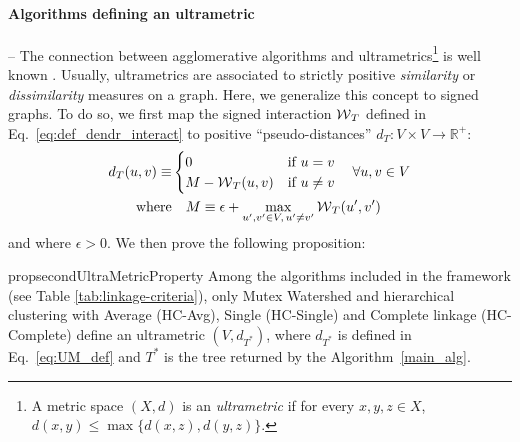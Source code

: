\paragraph{Algorithms defining an ultrametric} -- The connection between agglomerative algorithms and ultrametrics\footnote{A metric space $(X,d)$ is an \emph{ultrametric} if for every $x,y,z \in X$, $d(x,y)\leq \max \{d(x,z), d(y,z)\}$.} is well known \cite{johnson1967hierarchical,milligan1979ultrametric}. Usually, ultrametrics are associated to strictly positive \emph{similarity} or \emph{dissimilarity} measures on a graph. Here, we generalize this concept to signed graphs. To do so, we first map the signed interaction $\mathcal{W}{}_{T}{}$ defined in Eq.~\ref{eq:def_dendr_interact} to positive ``pseudo-distances'' $d_{T}:V \times V \rightarrow \mathbb{R}^{+}$:
\begin{align}\label{eq:UM_def}
d_{T}(u,v)\equiv &\begin{cases}
0 & \text{if}\,\, u=v\\
M-\mathcal{W}{}_{T}(u,v) & \text{if}\,\, u\neq v
\end{cases}\quad \forall u,v\in V\\
\mathrm{where}& \quad  M \equiv  \epsilon + \max_{u',v'\in V,\,u'\neq v'}\mathcal{W}{}_{T}(u',v')
\end{align}
and where $\epsilon > 0$. 
We then prove the following proposition:
\begin{restatable}{prop}{secondUltraMetricProperty}
\label{prop:ultraMetric2}
Among the algorithms included in the \algname{} framework (see Table \ref{tab:linkage-criteria}), only Mutex Watershed and hierarchical clustering with Average (HC-Avg), Single (HC-Single) and Complete linkage (HC-Complete) define an ultrametric $(V, d_{T^*})$, where $d_{T^*}$ is defined in Eq.~\ref{eq:UM_def} and $T^*$ is the tree returned by the \algname{} Algorithm~\ref{main_alg}.
\end{restatable}






